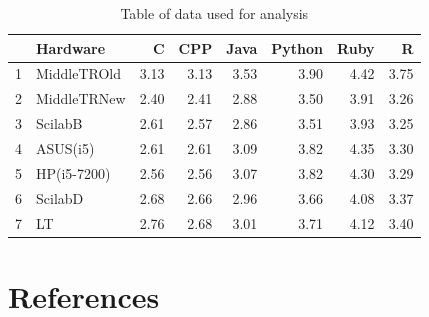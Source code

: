 \documentclass[12pt,halfline,a4paper,]{ouparticle}
\begin{document}
\begin{table}[ht]
\centering
\begin{tabular}{rlrrrrrr}
  \hline
 & Hardware & C & CPP & Java & Python & Ruby & R \\ 
  \hline
1 & MiddleTROld & 3.13 & 3.13 & 3.53 & 3.90 & 4.42 & 3.75 \\ 
  2 & MiddleTRNew & 2.40 & 2.41 & 2.88 & 3.50 & 3.91 & 3.26 \\ 
  3 & ScilabB & 2.61 & 2.57 & 2.86 & 3.51 & 3.93 & 3.25 \\ 
  4 & ASUS(i5) & 2.61 & 2.61 & 3.09 & 3.82 & 4.35 & 3.30 \\ 
  5 & HP(i5-7200) & 2.56 & 2.56 & 3.07 & 3.82 & 4.30 & 3.29 \\ 
  6 & ScilabD & 2.68 & 2.66 & 2.96 & 3.66 & 4.08 & 3.37 \\ 
  7 & LT & 2.76 & 2.68 & 3.01 & 3.71 & 4.12 & 3.40 \\ 
   \hline
\end{tabular}
\caption{Table of data used for analysis} 
\end{table}

\newpage

\section*{References}\label{references}
\end{document}
